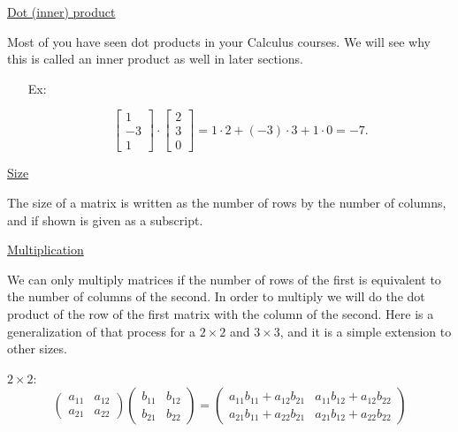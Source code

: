 \documentclass[reqno]{amsart}
\theoremstyle{definition}
\begin{document}
\bigskip

\underline{Dot (inner) product}

Most of you have seen dot products in your Calculus courses.  We will see why this is called an
inner product as well in later sections.

\begin{itemize}

\item[Ex:  ]

\begin{equation*}
\begin{bmatrix}
1\\
-3\\
1
\end{bmatrix}\cdot \begin{bmatrix}
2\\
3\\
0
\end{bmatrix} = 1\cdot 2 + (-3)\cdot 3 + 1\cdot 0 = -7.
\end{equation*}

\end{itemize}

\bigskip

\underline{Size}

The size of a matrix is written as the number of rows by the number of columns, and if shown is given as
a subscript.

\bigskip

\underline{Multiplication}

We can only multiply matrices if the number of rows of the first is equivalent to the number of columns of the second.
In order to multiply we will do the dot product of the row of the first matrix with the column of the second.  Here is a
generalization of that process for a $2 \times 2$ and $3 \times 3$, and it is a simple extension to other sizes.

$2 \times 2$:
%
\begin{equation}
\begin{pmatrix}
a_{11} & a_{12}\\
a_{21} & a_{22}
\end{pmatrix}\begin{pmatrix}
b_{11} & b_{12}\\
b_{21} & b_{22}
\end{pmatrix} = \begin{pmatrix}
a_{11}b_{11} + a_{12}b_{21} & a_{11}b_{12} + a_{12}b_{22}\\
a_{21}b_{11} + a_{22}b_{21} & a_{21}b_{12} + a_{22}b_{22}
\end{pmatrix}
\end{equation}
\end{document}
